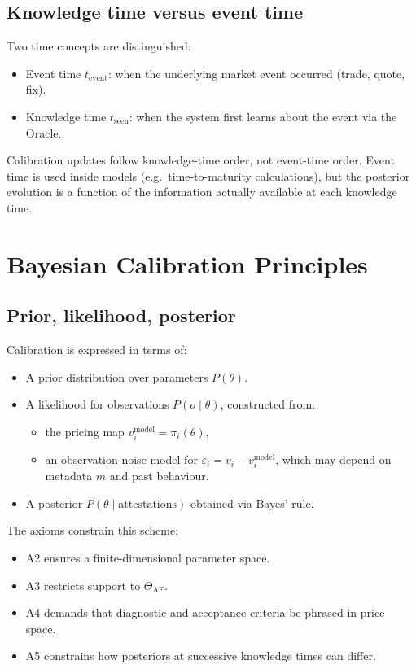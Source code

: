 \documentclass[11pt,a4paper]{article}
\begin{document}
\subsection{Knowledge time versus event time}

Two time concepts are distinguished:
\begin{itemize}
    \item Event time $t_{\text{event}}$: when the underlying market event occurred (trade, quote, fix).
    \item Knowledge time $t_{\text{seen}}$: when the system first learns about the event via the Oracle.
\end{itemize}

Calibration updates follow knowledge-time order, not event-time order. Event time is used inside models (e.g.\ time-to-maturity calculations), but the posterior evolution is a function of the information actually available at each knowledge time.

\section{Bayesian Calibration Principles}

\subsection{Prior, likelihood, posterior}

Calibration is expressed in terms of:
\begin{itemize}
    \item A prior distribution over parameters $P(\theta)$.
    \item A likelihood for observations $P(o \mid \theta)$, constructed from:
    \begin{itemize}
        \item the pricing map $v_i^{\text{model}} = \pi_i(\theta)$,
        \item an observation-noise model for $\varepsilon_i = v_i - v_i^{\text{model}}$, which may depend on metadata $m$ and past behaviour.
    \end{itemize}
    \item A posterior $P(\theta \mid \text{attestations})$ obtained via Bayes' rule.
\end{itemize}

The axioms constrain this scheme:
\begin{itemize}
    \item A2 ensures a finite-dimensional parameter space.
    \item A3 restricts support to $\Theta_{\text{AF}}$.
    \item A4 demands that diagnostic and acceptance criteria be phrased in price space.
    \item A5 constrains how posteriors at successive knowledge times can differ.
\end{itemize}
\end{document}
